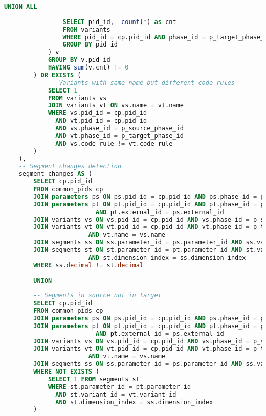 \begin{lstlisting}[language=SQL, caption={Phase Comparison Function}, label={lst:phase-comparison}]
                UNION ALL
                
                SELECT pid_id, -count(*) as cnt
                FROM variants
                WHERE pid_id = cp.pid_id AND phase_id = p_target_phase_id
                GROUP BY pid_id
            ) v
            GROUP BY v.pid_id
            HAVING sum(v.cnt) != 0
        ) OR EXISTS (
            -- Variants with same name but different code rules
            SELECT 1
            FROM variants vs
            JOIN variants vt ON vs.name = vt.name
            WHERE vs.pid_id = cp.pid_id
              AND vt.pid_id = cp.pid_id
              AND vs.phase_id = p_source_phase_id
              AND vt.phase_id = p_target_phase_id
              AND vs.code_rule != vt.code_rule
        )
    ),
    -- Segment changes detection
    segment_changes AS (
        SELECT cp.pid_id
        FROM common_pids cp
        JOIN parameters ps ON ps.pid_id = cp.pid_id AND ps.phase_id = p_source_phase_id
        JOIN parameters pt ON pt.pid_id = cp.pid_id AND pt.phase_id = p_target_phase_id
                         AND pt.external_id = ps.external_id
        JOIN variants vs ON vs.pid_id = cp.pid_id AND vs.phase_id = p_source_phase_id
        JOIN variants vt ON vt.pid_id = cp.pid_id AND vt.phase_id = p_target_phase_id
                       AND vt.name = vs.name
        JOIN segments ss ON ss.parameter_id = ps.parameter_id AND ss.variant_id = vs.variant_id
        JOIN segments st ON st.parameter_id = pt.parameter_id AND st.variant_id = vt.variant_id
                       AND st.dimension_index = ss.dimension_index
        WHERE ss.decimal != st.decimal
        
        UNION
        
        -- Segments in source not in target
        SELECT cp.pid_id
        FROM common_pids cp
        JOIN parameters ps ON ps.pid_id = cp.pid_id AND ps.phase_id = p_source_phase_id
        JOIN parameters pt ON pt.pid_id = cp.pid_id AND pt.phase_id = p_target_phase_id
                         AND pt.external_id = ps.external_id
        JOIN variants vs ON vs.pid_id = cp.pid_id AND vs.phase_id = p_source_phase_id
        JOIN variants vt ON vt.pid_id = cp.pid_id AND vt.phase_id = p_target_phase_id
                       AND vt.name = vs.name
        JOIN segments ss ON ss.parameter_id = ps.parameter_id AND ss.variant_id = vs.variant_id
        WHERE NOT EXISTS (
            SELECT 1 FROM segments st
            WHERE st.parameter_id = pt.parameter_id
              AND st.variant_id = vt.variant_id
              AND st.dimension_index = ss.dimension_index
        )
        

\end{lstlisting}
